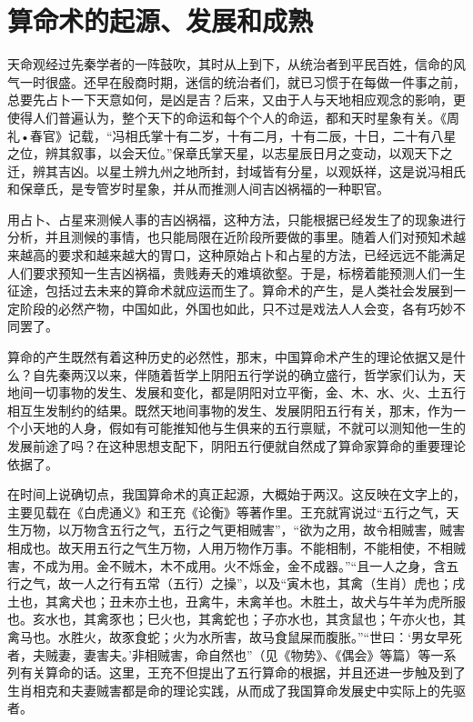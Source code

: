 \documentclass[a5paper,oneside,12pt]{ctexbook}
\begin{document}
\section{算命术的起源、发展和成熟}
天命观经过先秦学者的一阵鼓吹，其时从上到下，从统治者到平民百姓，信命的风气一时很盛。还早在殷商时期，迷信的统治者们，就已习惯于在每做一件事之前，总要先占卜一下天意如何，是凶是吉？后来，又由于人与天地相应观念的影响，更使得人们普遍认为，整个天下的命运和每个个人的命运，都和天时星象有关。《周礼•春官》记载，“冯相氏掌十有二岁，十有二月，十有二辰，十日，二十有八星之位，辨其叙事，以会天位。”保章氏掌天星，以志星辰日月之变动，以观天下之迁，辨其吉凶。以星土辨九州之地所封，封域皆有分星，以观妖祥，这是说冯相氏和保章氏，是专管岁时星象，并从而推测人间吉凶祸福的一种职官。

用占卜、占星来测候人事的吉凶祸福，这种方法，只能根据已经发生了的现象进行分析，并且测候的事情，也只能局限在近阶段所要做的事里。随着人们对预知术越来越高的要求和越来越大的胃口，这种原始占卜和占星的方法，已经远远不能满足人们要求预知一生吉凶祸福，贵贱寿夭的难填欲壑。于是，标榜着能预测人们一生征途，包括过去未来的算命术就应运而生了。算命术的产生，是人类社会发展到一定阶段的必然产物，中国如此，外国也如此，只不过是戏法人人会变，各有巧妙不同罢了。

算命的产生既然有着这种历史的必然性，那末，中国算命术产生的理论依据又是什么？自先秦两汉以来，伴随着哲学上阴阳五行学说的确立盛行，哲学家们认为，天地间一切事物的发生、发展和变化，都是阴阳对立平衡，金、木、水、火、土五行相互生发制约的结果。既然天地间事物的发生、发展阴阳五行有关，那末，作为一个小天地的人身，假如有可能推知他与生俱来的五行禀赋，不就可以测知他一生的发展前途了吗？在这种思想支配下，阴阳五行便就自然成了算命家算命的重要理论依据了。

在时间上说确切点，我国算命术的真正起源，大概始于两汉。这反映在文字上的，主要见载在《白虎通义》和王充《论衡》等著作里。王充就宵说过“五行之气，天生万物，以万物含五行之气，五行之气更相贼害”，“欲为之用，故令相贼害，贼害相成也。故天用五行之气生万物，人用万物作万事。不能相制，不能相使，不相贼害，不成为用。金不贼木，木不成用。火不烁金，金不成器。”“且一人之身，含五行之气，故一人之行有五常（五行）之操”，以及“寅木也，其禽（生肖）虎也；戌土也，其禽犬也；丑未亦土也，丑禽牛，未禽羊也。木胜土，故犬与牛羊为虎所服也。亥水也，其禽豕也；巳火也，其禽蛇也；子亦水也，其贪鼠也；午亦火也，其禽马也。水胜火，故豕食蛇；火为水所害，故马食鼠屎而腹胀。”“世曰：‘男女早死者，夫贼妻，妻害夫。’非相贼害，命自然也”（见《物势》、《偶会》等篇）等一系列有关算命的话。这里，王充不但提出了五行算命的根据，并且还进一步触及到了生肖相克和夫妻贼害都是命的理论实践，从而成了我国算命发展史中实际上的先驱者。
\end{document}
